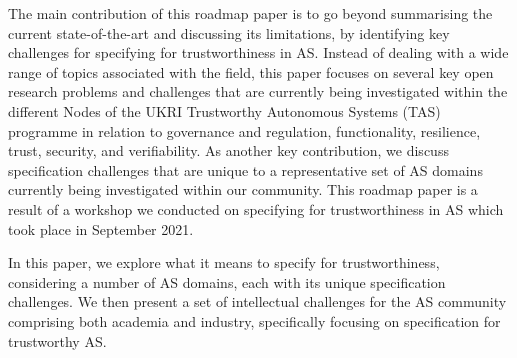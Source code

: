 \documentclass[sigconf,nonacm]{acmart}%
\begin{document}
	The main contribution of this roadmap paper is to go beyond summarising the current state-of-the-art and discussing its limitations, by identifying key challenges for specifying for trustworthiness in AS. Instead of dealing with a wide range of topics associated with the field, this paper focuses on several key open research problems and challenges that are currently being investigated within the different Nodes of the UKRI Trustworthy Autonomous Systems (TAS) programme in relation to governance and regulation, functionality, resilience, trust, security, and verifiability. As another key contribution, we discuss specification challenges that are unique to a representative set of AS domains currently being investigated within our community. This roadmap paper is a result of a workshop we conducted on specifying for trustworthiness in AS which took place in September 2021.
	
	In this paper, we explore what it means to specify for trustworthiness, considering a number of AS domains, each with its unique specification challenges. We then present a set of intellectual challenges for the AS community comprising both academia and industry, specifically focusing on specification for trustworthy AS.
	
\end{document}
